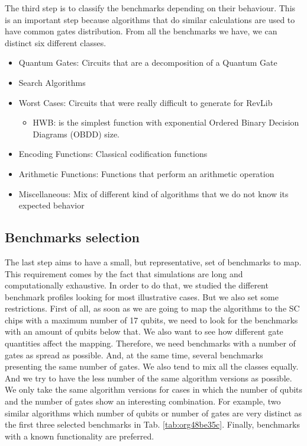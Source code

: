 The third step is to classify the benchmarks depending on their behaviour.
This is an important step because algorithms that do similar calculations are used to have common gates distribution.
From all the benchmarks we have, we can distinct six different classes.

\begin{itemize}
\item Quantum Gates: Circuits that are a decomposition of a Quantum Gate
\item Search Algorithms
\item Worst Cases: Circuits that were really difficult to generate for RevLib
\begin{itemize}
\item HWB: is the simplest function with exponential Ordered Binary Decision Diagrams (OBDD) size.
\end{itemize}
\item Encoding Functions: Classical codification functions
\item Arithmetic Functions: Functions that perform an arithmetic operation
\item Miscellaneous: Mix of different kind of algorithms that we do not know its expected behavior
\end{itemize}


\subsection*{Benchmarks selection}
\label{sec:org95bb5d0}

The last step aims to have a small, but representative, set of benchmarks to map.
This requirement comes by the fact that simulations are long and computationally exhaustive.
In order to do that, we studied the different benchmark profiles looking for most illustrative cases.
But we also set some restrictions.
First of all, as soon as we are going to map the algorithms to the SC chips with a maximum number of 17 qubits, we need to look for the benchmarks with an amount of qubits below that.
We also want to see how different gate quantities affect the mapping.
Therefore, we need benchmarks with a number of gates as spread as possible.
And, at the same time, several benchmarks presenting the same number of gates.
We also tend to mix all the classes equally.
And we try to have the less number of the same algorithm versions as possible.
We only take the same algorithm versions for cases in which the number of qubits and the number of gates show an interesting combination.
For example, two similar algorithms which number of qubits or number of gates are very distinct as the first three selected benchmarks in Tab. \ref{tab:org48be35c}.
Finally, benchmarks with a known functionality are preferred.

